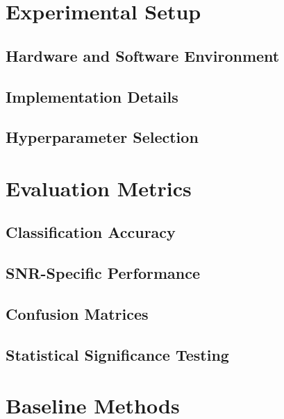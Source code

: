 \section{Experimental Setup}

\subsection{Hardware and Software Environment}

\subsection{Implementation Details}

\subsection{Hyperparameter Selection}

\section{Evaluation Metrics}

\subsection{Classification Accuracy}

\subsection{SNR-Specific Performance}

\subsection{Confusion Matrices}

\subsection{Statistical Significance Testing}

\section{Baseline Methods}

